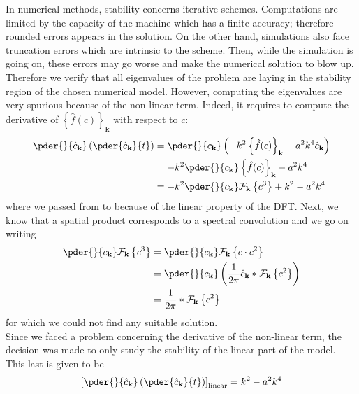 \documentclass[10pt,a4paper,twocolumn]{article}
\begin{document}
In numerical methods, stability concerns iterative schemes. Computations are limited by the capacity of the machine which has a finite accuracy; therefore rounded errors appears in the solution. On the other hand, simulations also face truncation errors which are intrinsic to the scheme. Then, while the simulation is going on, these errors may go worse and make the numerical solution to blow up. Therefore we verify that all eigenvalues of the problem are laying in the stability region of the chosen numerical model. However, computing the eigenvalues are very spurious because of the non-linear term. Indeed, it requires to compute the derivative of $\left\{\hat f(c)\right\}_\mathbf{k}$ with respect to $c$:
\begin{align}
	\pder{}{\hat c_\mathbf{k}}\left(\pder{\hat c_\mathbf{k}}{t}\right) &= \pder{}{c_\mathbf{k}} \left( -k^2 \left\{ \hat f(c) \right\}_\mathbf{k} - a^2 k^4 \hat c_\mathbf{k} \right) \label{eq:stability_1} \\
	&= -k^2 \pder{}{c_\mathbf{k}} \left\{ \hat f(c) \right\}_\mathbf{k} - a^2 k^4 \label{eq:stability_2} \\
	&= -k^2 \pder{}{c_\mathbf{k}} \mathcal{F}_\mathbf{k}\left\{ c^3 \right\} + k^2 - a^2 k^4 \label{eq:stability_3}
\end{align}
where we passed from  to  because of the linear property of the DFT. Next, we know that a spatial product corresponds to a spectral convolution and we go on writing
\begin{align}
	\pder{}{c_\mathbf{k}} \mathcal{F}_\mathbf{k}\left\{ c^3 \right\} &= \pder{}{c_\mathbf{k}} \mathcal{F}_\mathbf{k}\left\{ c \cdot c^2 \right\} \\
	&= \pder{}{c_\mathbf{k}} \left( \frac{1}{2\pi} \hat c_\mathbf{k} * \mathcal{F}_\mathbf{k}\left\{ c^2 \right\} \right) \\
	&= \frac{1}{2\pi} * \mathcal{F}_\mathbf{k}\left\{ c^2 \right\}
\end{align}
for which we could not find any suitable solution.
\vspace{\baselineskip}\\
Since we faced a problem concerning the derivative of the non-linear term, the decision was made to only study the stability of the linear part of the model. This last is given to be
\begin{equation}
	\left[ \pder{}{\hat c_\mathbf{k}}\left(\pder{\hat c_\mathbf{k}}{t}\right) \right]_{\text{linear}} = k^2 - a^2 k^4
\end{equation}
\end{document}
